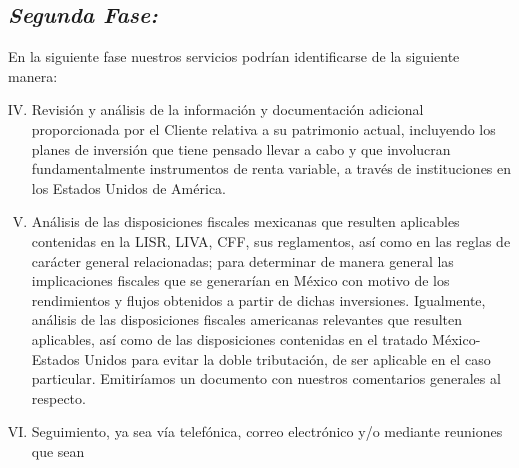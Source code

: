 \documentclass[5pt,letter]{report}
\begin{document}
\subsection*{\it Segunda Fase:} %
En la siguiente fase nuestros servicios podrían identificarse de la siguiente manera: 
\begin{enumerate}[I.]
\setcounter{enumi}{3}
\item 
Revisión y análisis de la información y documentación adicional proporcionada por el 
Cliente relativa a su patrimonio actual, incluyendo los planes de inversión que tiene 
pensado llevar a cabo y que involucran fundamentalmente instrumentos de renta 
variable, a través de instituciones en los Estados Unidos de América.  
\item 
Análisis de las disposiciones fiscales mexicanas que resulten aplicables contenidas en la 
LISR, LIVA, CFF, sus reglamentos, así como en las reglas de carácter general relacionadas; 
para determinar de manera general las implicaciones fiscales que se generarían en 
México con motivo de los rendimientos y flujos obtenidos a partir de dichas inversiones. 
Igualmente, análisis de las disposiciones fiscales americanas relevantes que resulten 
aplicables, así como de las disposiciones contenidas en el tratado México-Estados 
Unidos para evitar la doble tributación, de ser aplicable en el caso particular. 
Emitiríamos un documento con nuestros comentarios generales al respecto.  
\item 
Seguimiento, ya sea vía telefónica, correo electrónico y/o mediante reuniones que sean 
\end{enumerate}
\end{document}
